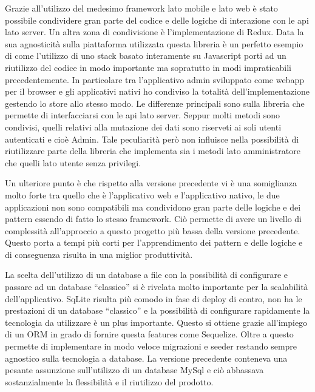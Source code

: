 Grazie all'utilizzo del medesimo framework lato mobile e lato web è stato possibile condividere gran parte del codice e delle logiche di interazione con le api lato server. Un altra zona di condivisione è l'implementazione di Redux. Data la sua agnosticità sulla piattaforma utilizzata questa libreria è un perfetto esempio di come l'utilizzo di uno stack basato interamente su Javascript porti ad un riutilizzo del codice in modo importante ma sopratutto in modi impraticabili precedentemente. In particolare tra l’applicativo admin sviluppato come webapp per il browser e gli applicativi nativi ho condiviso la totalità dell’implementazione gestendo lo store allo stesso modo. Le differenze principali sono sulla libreria che permette di interfacciarsi con le api lato server. Seppur molti metodi sono condivisi, quelli relativi alla mutazione dei dati sono riserveti ai soli utenti autenticati e cioè Admin. Tale peculiarità però non influisce nella possibilità di riutilizzare parte della libreria che implementa sia i metodi lato amministratore che quelli lato utente senza privilegi.\vspace{5mm} 

Un ulteriore punto è che rispetto alla versione precedente vi è una somiglianza molto forte tra quello che è l’applicativo web e l’applicativo nativo, le due applicazioni non sono compatibili ma condividono gran parte delle logiche e dei pattern essendo di fatto lo stesso framework. Ciò permette di avere un livello di complessità all'approccio a questo progetto più bassa della versione precedente. Questo porta a tempi più corti per l'apprendimento dei pattern e delle logiche e di conseguenza risulta in una miglior produttività.\vspace{5mm}
	
La scelta dell’utilizzo di un database a file con la possibilità di configurare e passare ad un database “classico” si è rivelata molto importante per la scalabilità dell’applicativo. SqLite risulta più comodo in fase di deploy di contro, non ha le prestazioni di un database “classico” e la possibilità di configurare rapidamente la tecnologia da utilizzare è un plus importante. Questo si ottiene grazie all’impiego di un ORM in grado di fornire questa features come Sequelize. Oltre a questo permette di implementare in modo veloce migrazioni e seeder restando sempre agnostico sulla tecnologia a database. La versione precedente conteneva una pesante assunzione sull’utilizzo di un database MySql e ciò abbassava sostanzialmente la flessibilità e il riutilizzo del prodotto.\vspace{5mm}

